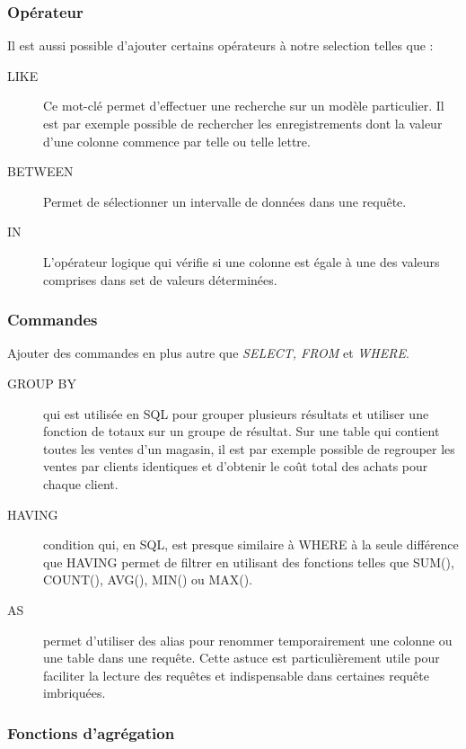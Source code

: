 \documentclass[oneside,13pt,a4paper]{report}
\begin{document}
\subsubsection{Opérateur}

Il est aussi possible d'ajouter certains opérateurs à notre selection telles que :
\begin{description}
	\item[LIKE] Ce mot-clé permet d’effectuer une recherche sur un modèle particulier. Il est par exemple possible de rechercher les enregistrements dont la valeur d’une colonne commence par telle ou telle lettre.
	\item[BETWEEN] Permet de sélectionner un intervalle de données dans une requête.
	\item[IN] L’opérateur logique qui vérifie si une colonne est égale à une des valeurs comprises dans set de valeurs déterminées.
\end{description}

\subsubsection{Commandes}

Ajouter des commandes en plus autre que \textit{SELECT, FROM} et \textit{WHERE}.

\begin{description}
	\item[GROUP BY] qui est utilisée en SQL pour grouper plusieurs résultats et utiliser une fonction de totaux sur un groupe de résultat. Sur une table qui contient toutes les ventes d’un magasin, il est par exemple possible de regrouper les ventes par clients identiques et d’obtenir le coût total des achats pour chaque client.
	\item[HAVING] condition qui, en SQL, est presque similaire à WHERE à la seule différence que HAVING permet de filtrer en utilisant des fonctions telles que SUM(), COUNT(), AVG(), MIN() ou MAX().
	\item[AS] permet d’utiliser des alias pour renommer temporairement une colonne ou une table dans une requête. Cette astuce est particulièrement utile pour faciliter la lecture des requêtes et indispensable dans certaines requête imbriquées.
\end{description}

\subsubsection{Fonctions d'agrégation}
\end{document}

